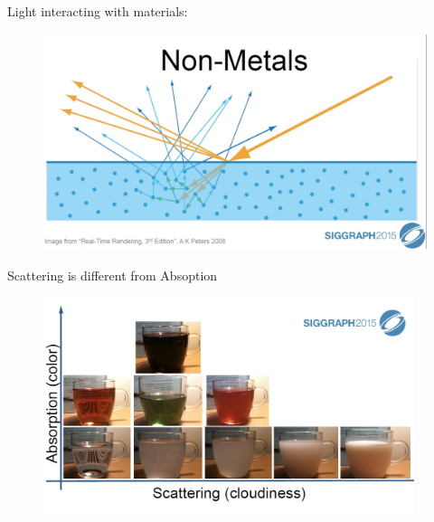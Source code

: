 \documentclass[]{beamer}
\begin{document}

\begin{frame}


    \textcolor{mypink1}{Light interacting with materials:}
   

    
    \begin{figure}[h!]
      \begin{center}
        \includegraphics[height=2.5in]{images/5.jpg}
      \end{center}
    \end{figure}
  \end{frame}
    
\begin{frame}


    \textcolor{mypink1}{Scattering is different from Absoption }
   

    
    \begin{figure}[h!]
      \begin{center}
        \includegraphics[height=2.5in]{images/6.jpg}
      \end{center}
    \end{figure}
  \end{frame}
\end{document}
